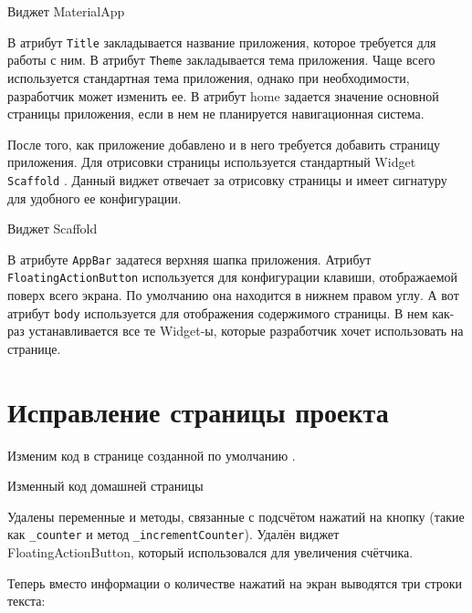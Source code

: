 \begin{image}
	\caption{Виджет MaterialApp}
	\label{fig:widget:materialapp}
\end{image}

В атрибут \texttt{Title} закладывается название приложения,
которое требуется для работы с ним.
В атрибут \texttt{Theme} закладывается тема приложения.
Чаще всего используется стандартная тема приложения,
однако при необходимости, разработчик может изменить ее.
В атрибут home задается значение основной страницы приложения,
если в нем не планируется навигационная система.\par
После того, как приложение добавлено
и в него требуется добавить страницу приложения.
Для отрисовки страницы используется
стандартный Widget \texttt{Scaffold} .
Данный виджет отвечает за отрисовку страницы и имеет сигнатуру
для удобного ее конфигурации.

\begin{image}
	\caption{Виджет Scaffold}
	\label{fig:widget:scaffold}
\end{image}

В атрибуте \texttt{AppBar} задатеся верхняя шапка приложения.
Атрибут \texttt{FloatingActionButton} используется для конфигурации клавиши,
отображаемой поверх всего экрана.
По умолчанию она находится в нижнем правом углу.
А вот атрибут \texttt{body} используется для отображения содержимого страницы.
В нем как-раз устанавливается все те Widget-ы,
которые разработчик хочет использовать на странице.

\section{Исправление страницы проекта}

Изменим код в странице созданной по умолчанию .

\begin{image}
	\caption{Изменный код домашней страницы}
	\label{fig:page:code:new}
\end{image}

Удалены переменные и методы,
связанные с подсчётом нажатий на кнопку
(такие как \texttt{\_counter} и метод \texttt{\_incrementCounter}).
Удалён виджет FloatingActionButton, который использовался
для увеличения счётчика.\par
Теперь вместо информации о количестве нажатий на экран выводятся
три строки текста:

